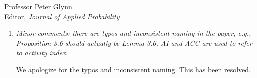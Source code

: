 \documentclass[11pt]{letter} %
\begin{document}
\begin{letter}{Professor
	Peter Glynn\\
	Editor, {\em Journal of Applied Probability}}
\begin{enumerate}
\vspace{5mm}
Separate models in FACE paper so we can use the ; however, it makes minimial difference.  So we cite this.
\vspace{5mm}

\item {\it Minor comments: there are typos and inconsistent naming in the paper, e.g., Proposition 3.6 should actually be Lemma 3.6, AI and ACC are used to refer to activity index.}

\vspace{5mm}
We apologize for the typos and inconsistent naming.  This has been resolved.
\vspace{5mm}

\end{enumerate}


\end{letter}
\end{document}
